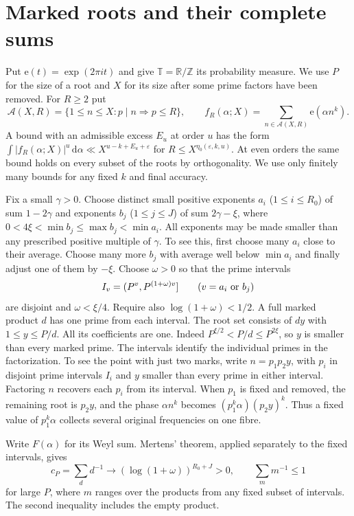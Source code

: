 \documentclass[11pt,letterpaper]{article}
\theoremstyle{definition}
\newcommand{\Z}{\mathbb Z}
\newcommand{\R}{\mathbb R}
\newcommand{\T}{\mathbb T}
\newcommand{\A}{\mathcal A}
\newcommand{\e}{\mathrm e}
\newcommand{\dd}{\,\mathrm d}
\newcommand{\eps}{\varepsilon}
\begin{document}
\section{Marked roots and their complete sums}\label{sec:roots}
Put $\e(t)=\exp(2\pi i t)$ and give $\T=\R/\Z$ its probability measure.
We use $P$ for the size of a root and $X$ for its size after some prime
factors have been removed. For $R\ge2$ put
\[
 \A(X,R)=\{1\le n\le X:p\mid n\Longrightarrow p\le R\},\qquad
 f_R(\alpha;X)=\sum_{n\in\A(X,R)}\e(\alpha n^k).
\]
A bound with an admissible excess $E_u$ at order $u$ has the form
$\int|f_R(\alpha;X)|^u\dd\alpha\ll X^{u-k+E_u+\eps}$
for $R\le X^{\eta_0(\eps,k,u)}$. At even orders the same bound holds
on every subset of the roots by orthogonality.
We use only finitely many bounds for any fixed $k$ and final accuracy.

Fix a small $\gamma>0$. Choose distinct small positive exponents $a_i$
($1\le i\le R_0$) of sum $1-2\gamma$ and exponents $b_j$
($1\le j\le J$) of sum $2\gamma-\xi$, where
$0<4\xi<\min b_j\le\max b_j<\min a_i$.
All exponents may be made smaller than any prescribed positive multiple
of $\gamma$. To see this, first choose many $a_i$ close to their average.
Choose many more $b_j$ with average well below $\min a_i$ and finally
adjust one of them by $-\xi$. Choose $\omega>0$ so that the prime
intervals
\[
 I_v=(P^v,P^{(1+\omega)v}]\qquad(v=a_i\ \hbox{or}\ b_j)
\]
are disjoint and $\omega<\xi/4$. Require also
$\log(1+\omega)<1/2$. A full marked product $d$ has one prime from each
interval. The root set consists of $d y$ with $1\le y\le P/d$.
All its coefficients are one. Indeed $P^{\xi/2}<P/d\le P^{2\xi}$, so
$y$ is smaller than every marked prime. The intervals identify the
individual primes in the factorization. To see the point with just two
marks, write $n=p_1p_2y$, with $p_i$ in disjoint prime intervals
$I_i$ and $y$ smaller than every prime in either interval. Factoring
$n$ recovers each $p_i$ from its interval. When $p_1$ is fixed and
removed, the remaining root is $p_2y$, and the phase
$\alpha n^k$ becomes $(p_1^k\alpha)(p_2y)^k$. Thus a fixed value of
$p_1^k\alpha$ collects several original frequencies on one fibre.

Write $F(\alpha)$ for its Weyl
sum. Mertens' theorem, applied separately to the fixed intervals, gives
\begin{equation}\label{eq:mass}
 c_P=\sum_d d^{-1}\longrightarrow (\log(1+\omega))^{R_0+J}>0,
 \qquad \sum_m m^{-1}\le1
\end{equation}
for large $P$, where $m$ ranges over the products from any fixed subset
of intervals. The second inequality includes the empty product.
\end{document}
